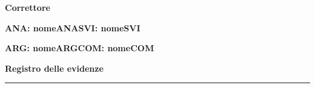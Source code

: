 \documentclass[10pt,a4paper]{article}
\newcommand{\indicatore}[1]{\textcolor{\csname colore#1\endcsname}{\textbf{#1: \csname nome#1\endcsname}}}
\newcommand{\legenda}{\indicatore{ANA}\quad\indicatore{SVI}\par
  \indicatore{ARG}\quad\indicatore{COM}}
\newcommand{\sez}[1]{\needspace{4\baselineskip}\par\vspace{1em}%
  {\large\bfseries #1}\par\vspace{-0.4em}\rule{\linewidth}{0.6pt}\par\vspace{0.2em}}
\newcommand{\materia}{}
\newcommand{\classe}{}
\begin{document}
\begin{center}
{\LARGE\bfseries Correttore\ \materia}\\[3pt]
\classe
\end{center}

\legenda
\sez{Registro delle evidenze}
\end{document}
